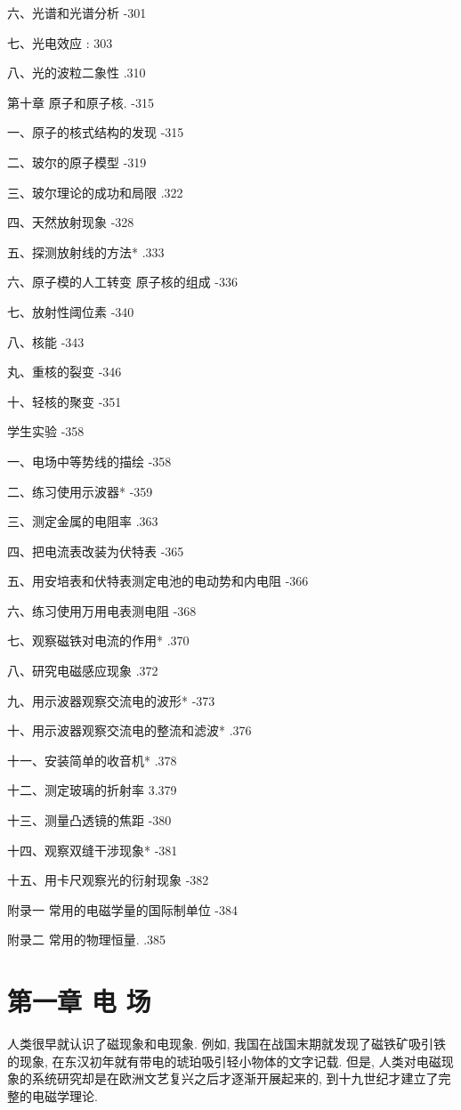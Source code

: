 \documentclass[10pt]{article}
\begin{document}
六、光谱和光谱分析 -301

七、光电效应 : 303

八、光的波粒二象性 .310

第十章 原子和原子核. -315

一、原子的核式结构的发现 -315

二、玻尔的原子模型 -319

三、玻尔理论的成功和局限 .322

四、天然放射现象 -328

五、探测放射线的方法* .333

六、原子模的人工转变 原子核的组成 -336

七、放射性阈位素 -340

八、核能 -343

丸、重核的裂变 -346

十、轻核的聚变 -351

学生实验 -358

一、电场中等势线的描绘 -358

二、练习使用示波器* -359

三、测定金属的电阻率 .363

四、把电流表改装为伏特表 -365

五、用安培表和伏特表测定电池的电动势和内电阻 -366

六、练习使用万用电表测电阻 -368

七、观察磁铁对电流的作用* .370

八、研究电磁感应现象 .372

九、用示波器观察交流电的波形* -373

十、用示波器观察交流电的整流和滤波* .376

十一、安装简单的收音机* .378

十二、测定玻璃的折射率 3.379

十三、测量凸透镜的焦距 -380

十四、观察双缝干涉现象* -381

十五、用卡尺观察光的衍射现象 -382

附录一 常用的电磁学量的国际制单位 -384

附录二 常用的物理恒量. .385

\section*{第一章 电 场}

人类很早就认识了磁现象和电现象. 例如, 我国在战国末期就发现了磁铁矿吸引铁的现象, 在东汉初年就有带电的琥珀吸引轻小物体的文字记载. 但是, 人类对电磁现象的系统研究却是在欧洲文艺复兴之后才逐渐开展起来的, 到十九世纪才建立了完整的电磁学理论.
\end{document}
